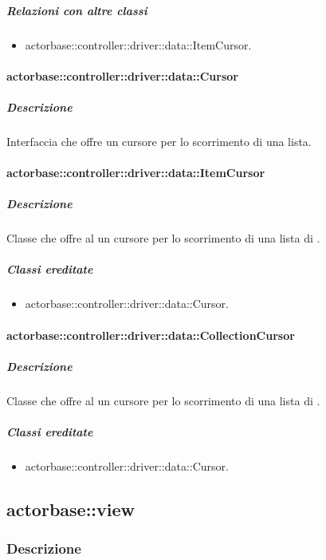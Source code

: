 \documentclass{scalatekids-article}
\begin{document}
\subparagraph{Relazioni con altre classi}

\begin{itemize}
\item actorbase::controller::driver::data::ItemCursor.
\end{itemize}

\paragraph{actorbase::controller::driver::data::Cursor}

\subparagraph{Descrizione}

Interfaccia che offre un cursore per lo scorrimento di una lista.

\paragraph{actorbase::controller::driver::data::ItemCursor}

\subparagraph{Descrizione}

Classe che offre al  un cursore per lo scorrimento di una lista di .

\subparagraph{Classi ereditate}

\begin{itemize}
\item actorbase::controller::driver::data::Cursor.
\end{itemize}

\paragraph{actorbase::controller::driver::data::CollectionCursor}

\subparagraph{Descrizione}

Classe che offre al  un cursore per lo scorrimento di una lista di .

\subparagraph{Classi ereditate}

\begin{itemize}
\item actorbase::controller::driver::data::Cursor.
\end{itemize}

\subsection{actorbase::view}

\subsubsection{Descrizione}
\end{document}

